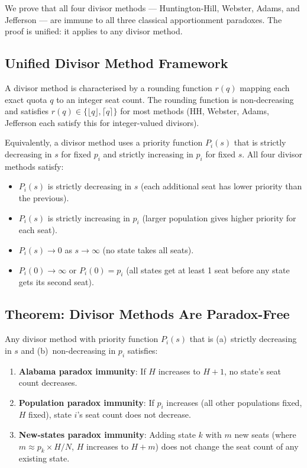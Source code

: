 \label{sec:immunity}

We prove that all four divisor methods --- Huntington-Hill, Webster,
Adams, and Jefferson --- are immune to all three classical apportionment
paradoxes.
The proof is unified: it applies to any divisor method.

\subsection{Unified Divisor Method Framework}

A divisor method is characterised by a rounding function $r(q)$
mapping each exact quota $q$ to an integer seat count.
The rounding function is non-decreasing and satisfies $r(q) \in
\{\lfloor q \rfloor, \lceil q \rceil\}$ for most methods
(HH, Webster, Adams, Jefferson each satisfy this for integer-valued
divisors).

Equivalently, a divisor method uses a priority function $P_i(s)$
that is strictly decreasing in $s$ for fixed $p_i$
and strictly increasing in $p_i$ for fixed $s$.
All four divisor methods satisfy:
\begin{itemize}
  \item $P_i(s)$ is strictly decreasing in $s$ (each additional seat
    has lower priority than the previous).
  \item $P_i(s)$ is strictly increasing in $p_i$ (larger population
    gives higher priority for each seat).
  \item $P_i(s) \to 0$ as $s \to \infty$ (no state takes all seats).
  \item $P_i(0) \to \infty$ or $P_i(0) = p_i$ (all states get at least 1 seat
    before any state gets its second seat).
\end{itemize}

\subsection{Theorem: Divisor Methods Are Paradox-Free}

\begin{theorem}
  \label{thm:divisor-immune}
  Any divisor method with priority function $P_i(s)$ that is
  (a)~strictly decreasing in $s$ and (b)~non-decreasing in $p_i$
  satisfies:
  \begin{enumerate}
    \item[(i)] \textbf{Alabama paradox immunity}: If $H$ increases to $H+1$,
      no state's seat count decreases.
    \item[(ii)] \textbf{Population paradox immunity}: If $p_i$ increases
      (all other populations fixed, $H$ fixed), state $i$'s seat count
      does not decrease.
    \item[(iii)] \textbf{New-states paradox immunity}: Adding state $k$
      with $m$ new seats (where $m \approx p_k \times H / N$,
      $H$ increases to $H+m$) does not change the seat count of
      any existing state.
  \end{enumerate}
\end{theorem}

